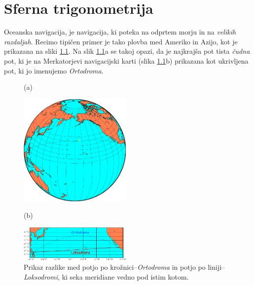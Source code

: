 \chapter{Sferna trigonometrija}

Oceanska navigacija, je navigacija, ki poteka na odprtem morju in na \emph{velikih razdaljah}. Recimo tipičen primer je tako plovba med Ameriko in Azijo, kot je prikazana na sliki \ref{fig:02-01-ortodorma_loksodroma}. Na slik \ref{fig:02-01-ortodorma_loksodroma}a se takoj opazi, da je najkrajša pot tista \textit{čudna} pot, ki je na Merkatorjevi navigacijski karti (slika \ref{fig:02-01-ortodorma_loksodroma}b) prikazana kot ukrivljena pot, ki jo imenujemo \emph{Ortodroma}. 

	\begin{figure}[!htpbp]
		\begin{minipage}[t]{55mm}
			(a)
			\vspace{2mm}
			\begin{center}
				\includegraphics[width=55mm]{02_st/figs/fig_02_01-gc_path.pdf}
			\end{center}
		\end{minipage}
		\hfill
		\begin{minipage}[t]{55mm}
			(b)
			\vspace{2mm}
			\begin{center}
				\includegraphics[width=55mm]{02_st/figs/fig_02_02-gc_RL-path.pdf}
			\end{center}
		\end{minipage}
		\caption{Prikaz razlike med potjo po krožnici--\textit{Ortodroma} in potjo po liniji--\textit{Loksodromi}, ki seka meridiane vedno pod istim kotom.}
		\label{fig:02-01-ortodorma_loksodroma}
	\end{figure}

